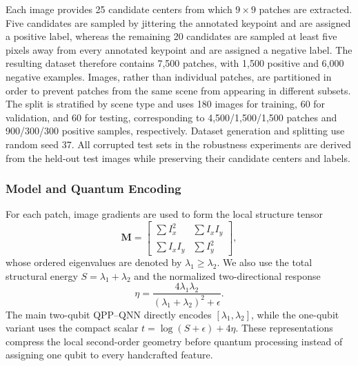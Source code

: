 \documentclass[11pt]{article}
\begin{document}
Each image provides 25 candidate centers from which $9\times9$ patches are
extracted. Five candidates are sampled by jittering the annotated keypoint and
are assigned a positive label, whereas the remaining 20 candidates are sampled
at least five pixels away from every annotated keypoint and are assigned a
negative label. The resulting dataset therefore contains 7,500 patches, with
1,500 positive and 6,000 negative examples. Images, rather than individual
patches, are partitioned in order to prevent patches from the same scene from
appearing in different subsets. The split is stratified by scene type and uses
180 images for training, 60 for validation, and 60 for testing, corresponding
to 4,500/1,500/1,500 patches and 900/300/300 positive samples, respectively.
Dataset generation and splitting use random seed 37. All corrupted test sets
in the robustness experiments are derived from the held-out test images while
preserving their candidate centers and labels.

\subsubsection{Model and Quantum Encoding}

For each patch, image gradients are used to form the local structure tensor
\begin{equation}
    \mathbf{M}=
    \begin{bmatrix}
        \sum I_x^2 & \sum I_x I_y \\
        \sum I_x I_y & \sum I_y^2
    \end{bmatrix},
\end{equation}
whose ordered eigenvalues are denoted by $\lambda_1\geq\lambda_2$. We also use
the total structural energy $S=\lambda_1+\lambda_2$ and the normalized
two-directional response
\begin{equation}
    \eta=\frac{4\lambda_1\lambda_2}{(\lambda_1+\lambda_2)^2+\epsilon}.
\end{equation}
The main two-qubit QPP--QNN directly encodes
$[\lambda_1,\lambda_2]$, while the one-qubit variant uses the compact scalar
$t=\log(S+\epsilon)+4\eta$. These representations compress the local
second-order geometry before quantum processing instead of assigning one qubit
to every handcrafted feature.
\end{document}
